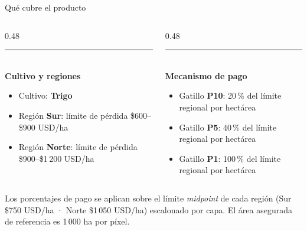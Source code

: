 \documentclass[aspectratio=169,11pt]{beamer}
\begin{document}
\begin{frame}{Qué cubre el producto}
  \begin{columns}[T]
    \begin{column}{0.48\textwidth}
      \textcolor{sgreen}{\rule{\linewidth}{0.8pt}}\\[4pt]
      {\footnotesize\bfseries Cultivo y regiones}
      \begin{itemize}\footnotesize
        \item[\textcolor{sgreen}{\textbullet}] Cultivo: \textbf{Trigo}
        \item[\textcolor{sgreen}{\textbullet}] Región \textbf{Sur}: límite de pérdida \$600--\$900 USD/ha
        \item[\textcolor{sgreen}{\textbullet}] Región \textbf{Norte}: límite de pérdida \$900--\$1\,200 USD/ha
      \end{itemize}
    \end{column}
    \begin{column}{0.48\textwidth}
      \textcolor{sgreen}{\rule{\linewidth}{0.8pt}}\\[4pt]
      {\footnotesize\bfseries Mecanismo de pago}
      \begin{itemize}\footnotesize
        \item[\textcolor{sgreen}{\textbullet}] Gatillo \textbf{P10}: 20\,\% del límite regional por hectárea
        \item[\textcolor{sgreen}{\textbullet}] Gatillo \textbf{P5}: 40\,\% del límite regional por hectárea
        \item[\textcolor{sgreen}{\textbullet}] Gatillo \textbf{P1}: 100\,\% del límite regional por hectárea
      \end{itemize}
    \end{column}
  \end{columns}
  \vspace{0.5em}
  {\scriptsize\textcolor{smidgray}{%
    Los porcentajes de pago se aplican sobre el límite \textit{midpoint} de cada región
    (Sur \$750 USD/ha · Norte \$1\,050 USD/ha) escalonado por capa.
    El área asegurada de referencia es 1\,000 ha por píxel.}}
\end{frame}
\end{document}
